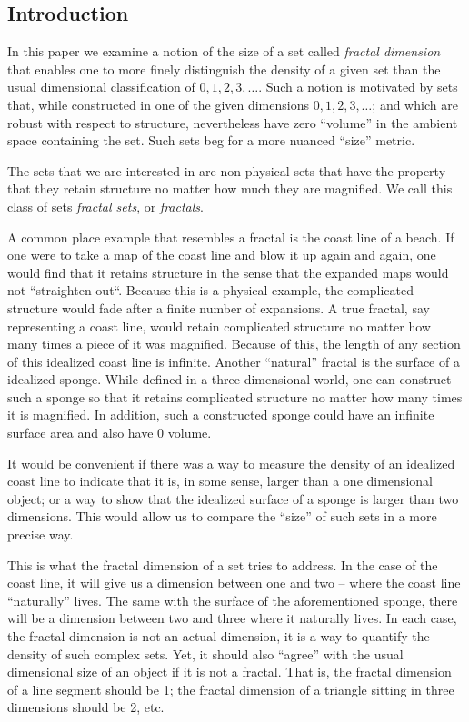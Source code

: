 \subsection{Introduction}
{\parindent=0pt
In this paper we examine a notion of the size of a set called 
{\it fractal dimension} that enables one to more
finely distinguish the density of a given set than the usual
dimensional classification of $0, 1, 2, 3, \ldots$.%
Such a notion is motivated by sets that, while constructed in one of the given
dimensions $0, 1, 2, 3, \dots$; and which are robust with respect to structure, 
nevertheless have zero ``volume'' in the ambient space containing the set.
Such sets beg for a more nuanced ``size'' metric.

The sets that we are interested in are non-physical sets that
have the property that they retain structure no matter how much 
they are magnified. We call this class of sets
{\it fractal sets}, or
{\it fractals}. 

A common place example that resembles a fractal is the coast line of
a beach. If one were to take a map of the coast line and blow it up
again and again, one would find that it retains structure in the
sense that the expanded maps would not ``straighten out``.
Because this is a physical example, the complicated structure would fade
after a finite number of expansions. A true fractal, say representing a 
coast line, would retain complicated
structure no matter how many times a piece of it was magnified.
Because of this, the length of any section of this idealized coast line is
infinite. Another ``natural'' fractal is the surface of a idealized sponge.
While defined in a three dimensional world, one can construct such a sponge so that
it retains complicated structure no matter how many times it is magnified.
In addition, such a constructed sponge could have an infinite surface area and 
also have 0 volume. 

It would be convenient if there was a way to
measure the density of an idealized coast line to
indicate that it is, in some sense, larger than a one dimensional
object; or a way to show that the idealized surface of a sponge is larger than
two dimensions. This would allow us to compare the ``size'' of such sets
in a more precise way.

This is what the fractal dimension of a set tries to address. 
In the case of the coast line, it will give us a dimension between one and two
-- where the coast line ``naturally'' lives. The same with the surface of
the aforementioned sponge,
there will be a dimension between two and three where it naturally lives. In
each case, the fractal dimension is not an actual dimension, 
it is a way to quantify the density of such complex sets.
Yet, it should also ``agree'' with the usual dimensional size of an object 
if it is not a fractal. That is, the fractal dimension of a line segment should 
be 1; the fractal dimension of a triangle sitting in three dimensions should 
be 2, etc.

}
